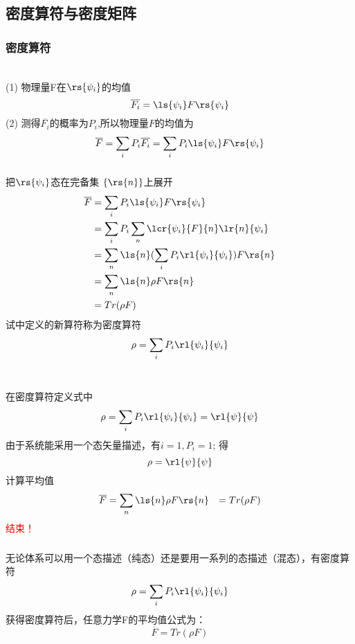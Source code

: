 \subsection{密度算符与密度矩阵}
\begin{frame} 
 \frametitle{密度算符}
     ~~\\ 
     \解 (1) 物理量F在$\rs{\psi_i}$的均值
    \[\overline{F_i}=\ls{\psi_i}F \rs{\psi_i}
    \]
    (2) 测得$\overline{F_i}$的概率为$P_i$,所以物理量$F$的均值为
    \[\overline{F}= \sum_i P_i \overline{F_i} = \sum_i P_i \ls{\psi_i}F \rs{\psi_i} \]
\end{frame}

\begin{frame}[label=current]
  \frametitle{}
  把$\rs{\psi_i}$态在完备集 $\{\rs{n}\}$上展开
  \[ \begin{aligned}
    \overline{F} &= \sum_i P_i \ls{\psi_i}F \rs{\psi_i} \\ 
    &= \sum_i P_i \sum_n \lcr{\psi_i}{F}{n}\lr{n}{\psi_i} \\
    &= \sum_n\ls{n} (\sum_i P_i \rl{\psi_i}{\psi_i} )F \rs{n} \\ 
    &= \sum_n\ls{n} \rho F\rs{n} \\
    &= Tr (\rho F)
  \end{aligned}\]
试中定义的新算符称为密度算符
$$\rho = \sum_i P_i\rl{\psi_i}{\psi_i} $$ 
\end{frame} 

\begin{frame} 
 \frametitle{} ~\\
      \解 在密度算符定义式中
      $$\rho = \sum_i P_i\rl{\psi_i}{\psi_i}  = \rl{\psi}{\psi}$$ 
      由于系统能采用一个态矢量描述，有$i=1, P_i=1$; 得
      $$\rho = \rl{\psi}{\psi}$$ 
      计算平均值
      \[ \begin{aligned}
        \overline{F} &= \sum_n\ls{n} \rho F\rs{n}
          &= Tr (\rho F)
      \end{aligned}\] 
    \textcolor{red}{结束！}
\end{frame}

\begin{frame}[label=current]
  \frametitle{}
  无论体系可以用一个态描述（纯态）还是要用一系列的态描述（混态），有密度算符
  $$\rho = \sum_i P_i\rl{\psi_i}{\psi_i} $$ 
  获得密度算符后，任意力学F的平均值公式为：
  \[\overline{F} = Tr (\rho F) \]
\end{frame} 
 
